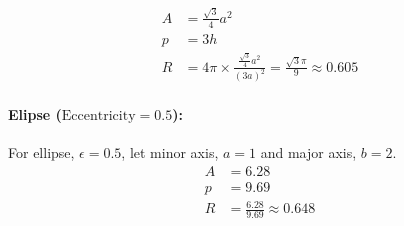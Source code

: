 \begin{align}
	A &= \frac{\sqrt{3}}{4}a^2 \\
	p &= 3h \\
	R &= 4\pi \times \frac{\frac{\sqrt{3}}{4}a^2}{(3a)^2} = \frac{\sqrt{3}\pi}{9} \approx 0.605
\end{align}

\paragraph{Elipse ($\textrm{Eccentricity} = 0.5$):}
\label{par:elipse}

For ellipse, $\epsilon = 0.5$, let minor axis, $a = 1$ and major axis, $b = 2$.
\begin{align}
	A &= 6.28 \\
	p &= 9.69 \\
	R &= \frac{6.28}{9.69} \approx 0.648
\end{align}
